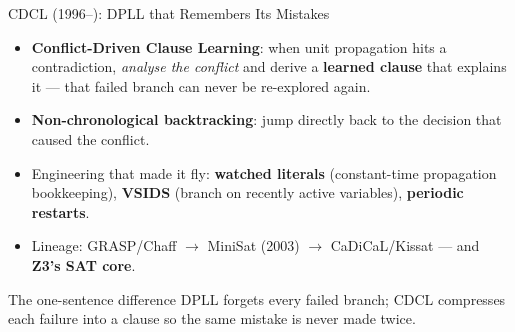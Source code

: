 \documentclass[10pt,aspectratio=169,xcolor={table}]{beamer}
\begin{document}
\begin{frame}{CDCL (1996--): DPLL that Remembers Its Mistakes}
  \begin{itemize}\itemsep4pt
    \item \textbf{Conflict-Driven Clause Learning}: when unit
          propagation hits a contradiction, \emph{analyse the
          conflict} and derive a \textbf{learned clause} that
          explains it --- that failed branch can never be
          re-explored again.
    \item \textbf{Non-chronological backtracking}: jump directly
          back to the decision that caused the conflict.
    \item Engineering that made it fly: \textbf{watched literals}
          (constant-time propagation bookkeeping),
          \textbf{VSIDS} (branch on recently active variables),
          \textbf{periodic restarts}.
    \item Lineage: GRASP/Chaff $\to$ MiniSat (2003) $\to$
          CaDiCaL/Kissat --- and \textbf{Z3's SAT core}.
  \end{itemize}
  \begin{block}{The one-sentence difference}
    DPLL forgets every failed branch; CDCL compresses each failure
    into a clause so the same mistake is never made twice.
  \end{block}
\end{frame}
\end{document}
